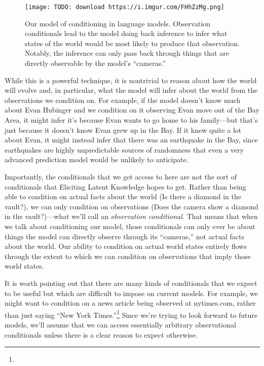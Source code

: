 {\begin{figure}[h!]
  \centering
  \texttt{[image: TODO: download https://i.imgur.com/FHhZzMg.png]}
  \caption{Our model of conditioning in language models. Observation conditionals lead to the model doing back inference to infer what states of the world would be most likely to produce that observation. Notably, the inference can only pass back through things that are directly observable by the model's ``cameras.''}
\end{figure}

While this is a powerful technique, it is nontrivial to reason about how the world will evolve and, in particular, what the model will infer about the world from the observations we condition on. For example, if the model doesn't know much about Evan Hubinger and we condition on it observing Evan move out of the Bay Area, it might infer it's because Evan wants to go home to his family---but that's just because it doesn't know Evan grew up in the Bay. If it knew quite a lot about Evan, it might instead infer that there was an earthquake in the Bay, since earthquakes are highly unpredictable sources of randomness that even a very advanced prediction model would be unlikely to anticipate.

Importantly, the conditionals that we get access to here are not the sort of conditionals that Eliciting Latent Knowledge\cite{TODO: cite https://www.alignmentforum.org/posts/qHCDysDnvhteW7kRd/arc-s-first-technical-report-eliciting-latent-knowledge} hopes to get. Rather than being able to condition on actual facts about the world (Is there a diamond in the vault?), we can only condition on observations (Does the camera show a diamond in the vault?)---what we'll call an \textit{observation conditional.} That means that when we talk about conditioning our model, those conditionals can only ever be about things the model can directly observe through its ``cameras,'' not actual facts about the world. Our ability to condition on actual world states entirely flows through the extent to which we can condition on observations that imply those world states.

It is worth pointing out that there are many kinds of conditionals that we expect to be useful but which are difficult to impose on current models. For example, we might want to condition on a news article being observed at nytimes.com, rather than just saying ``New York Times.''\footnote{} Since we're trying to look forward to future models, we'll assume that we can access essentially arbitrary observational conditionals unless there is a clear reason to expect otherwise.


}
